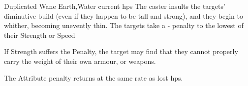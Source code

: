   {Duplicated}%
  {Wane}%
  {Earth,Water}%
  {current \glspl{hp}}%
  {The caster insults the targets' diminutive build (even if they happen to be tall and strong), and they begin to whither, becoming unevently thin.
    The targets take a - penalty to the lowest of their Strength or Speed}%
  {If Strength suffers the Penalty, the target may find that they cannot properly carry the weight of their own armour, or weapons.

    The Attribute penalty returns at the same rate as lost \glspl{hp}.}

